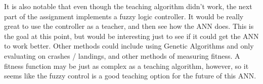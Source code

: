 \documentclass[12pt]{article}
\begin{document}
It is also notable that even though the teaching algorithm didn't work, the next part of the assignment 
implements a fuzzy logic controller. It would be really great to use the controller as a teacher, and then see
how the ANN does. This is the goal at this point, but would be interesting just to see if it could get the ANN
to work better. Other methods could include using Genetic Algorithms and only evaluating on crashes / 
landings, and other methods of measuring fitness. A fitness function may be just as complex as a teaching
algorithm, however, so it seems like the fuzzy control is a good teaching option for the future of this ANN.
\end{document}

